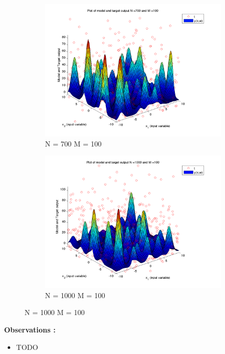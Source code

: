 \documentclass{article}
\begin{document}
\begin{figure}[H]
\begin{subfigure}{.5\textwidth}
\centering
\includegraphics[width=\linewidth]{D2/VaryingN_N700M100}
\caption{N = 700 M = 100}
\end{subfigure}
\begin{subfigure}{.5\textwidth}
\includegraphics[width=\linewidth]{D2/VaryingN_N1000M100}
\caption{N = 1000 M = 100}
\end{subfigure}



\end{figure}


\textbf{Observations :}

\begin{itemize}
\item TODO
\end{itemize}
\end{document}

